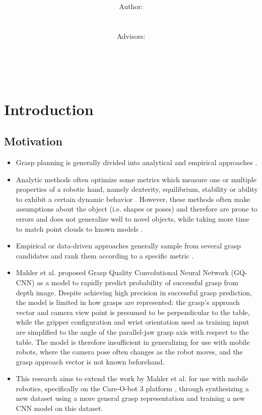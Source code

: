 \documentclass[12pt]{article}
\title{\normalsize \textsc{\hmwkAuthorSchool}   %
    \\[2.0cm]                                   %
    \HRule{0.5pt} \\                            %
    \LARGE \textbf{\uppercase{\hmwkTopic}}
    \HRule{2pt} \\ [0.5cm]                      %
    \hmwkTitle\\[0.5cm]
    \normalsize \hmwkDueDate\\
}
\author{
    \\[4.0cm]
    Author:\\
    \hmwkAuthorName\\
    \ \\
    Advisors:\\
    \hmwkAdvisorFirst\\
    \hmwkAdvisorSecond\\
    \hmwkAdvisorThird\\
}
\date{}
\begin{document}
    \maketitle
    \thispagestyle{firststyle}
    \newpage

\section{Introduction}

    \subsection{Motivation}
    \begin{itemize}
        \item Grasp planning is generally divided into analytical and empirical approaches \cite{Bohg2014}.
        \item Analytic methods often optimize some metrics which measure one or multiple properties of a robotic hand, namely dexterity, equilibrium, stability or ability to exhibit a certain dynamic behavior \cite{Bohg2014}. However, these methods often make assumptions about the object (i.e. shapes or poses) and therefore are prone to errors and does not generalize well to novel objects, while taking more time to match point clouds to known models \cite{Goldfeder2011}.
        \item Empirical or data-driven approaches generally sample from several grasp candidates and rank them according to a specific metric \cite{Bohg2014}. 
        \item Mahler et al. \cite{mahler2017} proposed Grasp Quality Convolutional Neural Network (GQ-CNN) as a model to rapidly predict probability of successful grasp from depth image. Despite achieving high precision in successful grasp prediction, the model is limited in how grasps are represented: the grasp's approach vector and camera view point is presumed to be perpendicular to the table, while the gripper configuration and wrist orientation used as training input are simplified to the angle of the parallel-jaw grasp axis with respect to the table. The model is therefore insufficient in generalizing for use with mobile robots, where the camera pose often changes as the robot moves, and the grasp approach vector is not known beforehand.
        \item This research aims to extend the work by Mahler et al. \cite{mahler2017} for use with mobile robotics, specifically on the Care-O-bot 3 platform , through synthesizing a new dataset using a more general grasp representation and training a new CNN model on this dataset. 
    \end{itemize}
\end{document}
